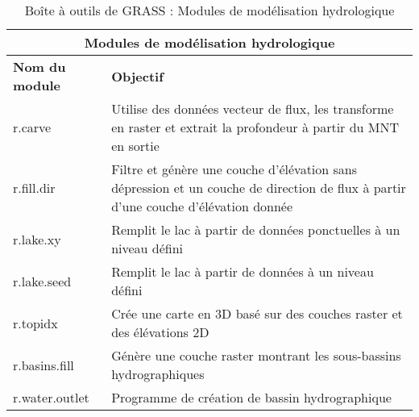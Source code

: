 \begin{table}[H]
\centering

 \begin{tabular}{|p{4cm}|p{10cm}|}
    \hline \multicolumn{2}{|c|}{\textbf{Modules de modélisation hydrologique}} \\
  \hline \textbf{Nom du module} & \textbf{Objectif} \\
  \hline r.carve & Utilise des données vecteur de flux, les transforme en raster et extrait la profondeur à partir du MNT en sortie\\
  \hline r.fill.dir & Filtre et génère une couche d'élévation sans dépression et un couche de direction de flux à partir d'une couche d'élévation donnée \\
  \hline r.lake.xy & Remplit le lac à partir de données ponctuelles à un niveau défini \\
  \hline r.lake.seed & Remplit le lac à partir de données à un niveau défini \\
  \hline r.topidx & Crée une carte en 3D basé sur des couches raster et des élévations 2D \\
  \hline r.basins.fill & Génère une couche raster montrant les sous-bassins hydrographiques \\
  \hline r.water.outlet & Programme de création de bassin hydrographique \\
\hline
\end{tabular}
\caption{Boîte à outils de GRASS : Modules de modélisation hydrologique}
\end{table}

